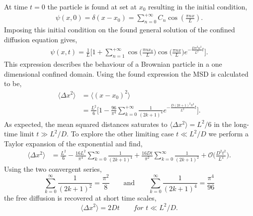 At time $t=0$ the particle is found at set at $x_0$ resulting in the initial condition,
\begin{align}
  \psi(x, 0) = \delta(x-x_0) = \sum_{n=0}^{+ \infty} C_n \cos(\frac{\pi n x}{L}).
\end{align}
Imposing this initial condition on the found general solution of the confined diffusion
equation gives,
\begin{align}
  \psi(x, t)=\frac{1}{L} \Bigg[ 1 + \sum_{n=1}^{+\infty} \cos\Big(\frac{\pi n
  x_0}{L}\Big) \cos\Big(\frac{\pi n x}{L}\Big) e^{- \frac{D\pi^2  n^2}{L^2}t}\Bigg].
\end{align}
This expression describes the behaviour of a Brownian particle in a one dimensional
confined domain. Using the found expression the MSD is calculated to be,
\begin{align}
  \langle \Delta x^2 \rangle &= \langle(x-x_0)^2\rangle\\&= \frac{L^2}{6}\Bigg[1 -
  \frac{96}{\pi^4}
  \sum_{k=0}^{+\infty} \frac{1}{(2k+1)^4} e^{- \frac{D(2k+1)^2 \pi^2}{L^2}t}\Bigg].
\end{align}
As expected, the mean squared distances saturates to $\langle \Delta x^2 \rangle = L^2/6$
in the long-time limit $t \gg L^2 / D.$ To explore the other limiting case $t \ll L^2/D
$ we perform a Taylor expansion of the exponential and find,
\begin{align}
  \langle \Delta x^2 \rangle &= \frac{L^2}{6} - \frac{16 L^2}{\pi^4} \sum_{k=0}^{\infty}
  \frac{1}{(2k+1)^4} + \frac{16 D t}{\pi^2} \sum_{k=0}^{\infty} \frac{1}{(2k+1)^2} +
  \mathcal{O}\bigg(\frac{D^2 t^2}{L^4}\bigg).
\end{align}
Using the two convergent series,
\begin{equation}
  \sum_{k=0}^{\infty} \frac{1}{(2k+1)^2} = \frac{\pi^2}{8} \qquad \text{and} \qquad
  \sum_{k=0}^{\infty} \frac{1}{(2k+1)^4} = \frac{\pi^4}{96}
\end{equation}
the free diffusion is recovered at short time scales, \cite{BICKEL200724}
\begin{equation}
\langle \Delta x^2 \rangle = 2Dt \qquad for\,\, t \ll L^2/D.
\end{equation}
